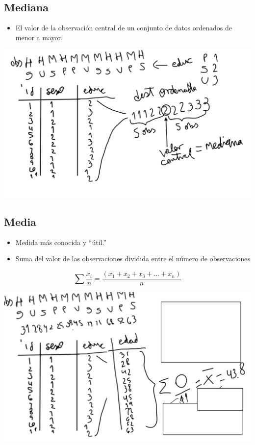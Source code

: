 \documentclass[
]{article}
\providecommand{\tightlist}{%
  \setlength{\itemsep}{0pt}\setlength{\parskip}{0pt}}
\begin{document}
\hypertarget{mediana}{%
\subsection{Mediana}\label{mediana}}

\begin{itemize}
\tightlist
\item
  El valor de la observación central de un conjunto de datos ordenados
  de menor a mayor.
\end{itemize}

\includegraphics[width=6.15625in,height=\textheight]{mediana.png}

\hypertarget{media}{%
\subsection{Media}\label{media}}

\begin{itemize}
\item
  Medida más conocida y ``útil.''
\item
  Suma del valor de las observaciones dividida entre el número de
  observaciones
\end{itemize}

\[
\sum \frac{x_i} {n} = \frac{(x_1 + x_2 +x_3 +...+ x_n)} {n}
\]

\includegraphics[width=6.1875in,height=\textheight]{media.png}
\end{document}
